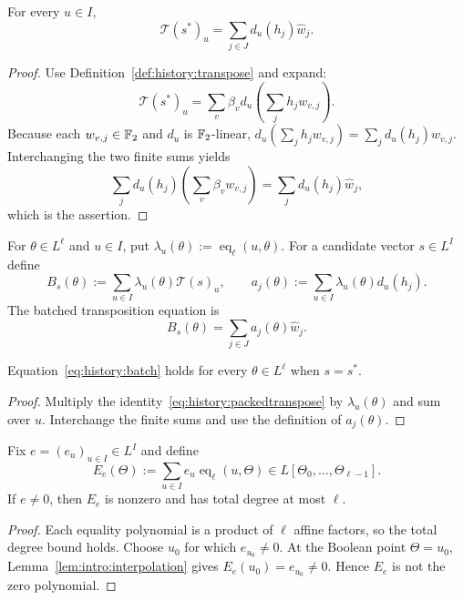 \begin{lemma}\label{lem:history:packedtranspose}
For every $u\in I$,
\begin{equation}\label{eq:history:packedtranspose}
 \mathcal T(s^*)_u=\sum_{j\in J}d_u(h_j)\widehat w_j.
\end{equation}
\end{lemma}
\begin{proof}
Use Definition~\ref{def:history:transpose} and expand:
\[
 \mathcal T(s^*)_u
  =\sum_v\beta_v d_u\left(\sum_jh_jw_{v,j}\right).
\]
Because each $w_{v,j}\in\mathbb{F}_2$ and $d_u$ is $\mathbb{F}_2$-linear,
$d_u(\sum_jh_jw_{v,j})=\sum_jd_u(h_j)w_{v,j}$.
Interchanging the two finite sums yields
\[
 \sum_jd_u(h_j)\left(\sum_v\beta_vw_{v,j}\right)
 =\sum_jd_u(h_j)\widehat w_j,
\]
which is the assertion.
\end{proof}

\begin{definition}\label{def:history:batch}
For $\theta\in L^\ell$ and $u\in I$, put $\lambda_u(\theta):=\operatorname{eq}_\ell(u,\theta)$. For a candidate vector $s\in L^I$ define
\[
 B_s(\theta):=\sum_{u\in I}\lambda_u(\theta)\mathcal T(s)_u,\qquad
 a_j(\theta):=\sum_{u\in I}\lambda_u(\theta)d_u(h_j).
\]
The batched transposition equation is
\begin{equation}\label{eq:history:batch}
 B_s(\theta)=\sum_{j\in J}a_j(\theta)\widehat w_j.
\end{equation}
\end{definition}

\begin{lemma}\label{lem:history:batch-correct}
Equation~\eqref{eq:history:batch} holds for every $\theta\in L^\ell$ when $s=s^*$.
\end{lemma}
\begin{proof}
Multiply the identity~\eqref{eq:history:packedtranspose} by $\lambda_u(\theta)$ and sum over $u$. Interchange the finite sums and use the definition of $a_j(\theta)$.
\end{proof}

\begin{lemma}\label{lem:history:rowerror}
Fix $e=(e_u)_{u\in I}\in L^I$ and define
\[
 E_e(\Theta):=\sum_{u\in I}e_u\operatorname{eq}_\ell(u,\Theta)\in L[\Theta_0,\ldots,\Theta_{\ell-1}].
\]
If $e\ne0$, then $E_e$ is nonzero and has total degree at most $\ell$.
\end{lemma}
\begin{proof}
Each equality polynomial is a product of $\ell$ affine factors, so the total degree bound holds. Choose $u_0$ for which $e_{u_0}\ne0$. At the Boolean point $\Theta=u_0$, Lemma~\ref{lem:intro:interpolation} gives
$E_e(u_0)=e_{u_0}\ne0$. Hence $E_e$ is not the zero polynomial.
\end{proof}

